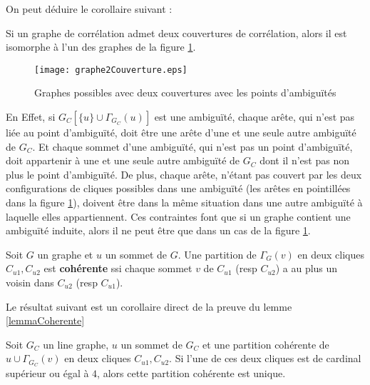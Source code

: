 On peut d\'eduire le corollaire suivant :
\begin{corollary}
Si un graphe de corr\'elation admet deux couvertures de corr\'elation, alors il est isomorphe \`a l'un des graphes de la figure  \ref{graphe2Couverture}.
\end{corollary}
\begin{centering} \vspace{-0.5em}
\begin{figure}[htb!] \vspace{-0.5em}
\texttt{[image: graphe2Couverture.eps]}
\caption{ Graphes possibles avec deux couvertures avec les points d'ambigu\"{i}t\'es }
\label{graphe2Couverture} 
\end{figure}
\end{centering} 
En Effet, si $G_C[\{u\} \cup \Gamma_{G_C}(u)]$ est une ambigu\"{i}t\'e, chaque ar\^ete, qui n'est pas li\'ee au point d'ambigu\"{i}t\'e, doit \^etre une ar\^ete d'une et une seule autre ambigu\"{i}t\'e de $G_C$. Et chaque sommet d'une ambigu\"{i}t\'e, qui n'est pas un point d'ambigu\"{i}t\'e, doit appartenir \`a une et une seule autre ambigu\"{i}t\'e de $G_C$ dont il n'est pas non  plus le point d'ambigu\"{i}t\'e.
De plus, chaque ar\^ete, n'\'etant pas couvert par les deux configurations de cliques possibles dans une ambigu\"{i}t\'e (les ar\^etes en pointill\'ees dans la figure \ref{graphe2Couverture}), doivent \^etre dans la m\^eme situation dans une autre ambigu\"{i}t\'e \`a laquelle elles appartiennent.
Ces contraintes font que si un graphe contient une ambigu\"{i}t\'e induite, alors il ne peut \^etre que dans un cas de la figure  \ref{graphe2Couverture}.

\begin{definition}
Soit $G$ un graphe et $u$ un sommet de $G$. Une partition de $\Gamma_G(v)$ en deux cliques $C_{u1}, C_{u2}$ est {\bf coh\'erente } ssi chaque sommet $v$ de $C_{u1}$ (resp $C_{u2}$) a au plus un voisin dans $C_{u2}$  (resp $C_{u1}$).
\end{definition}
Le r\'esultat suivant est un corollaire direct de la preuve du lemme \ref{lemmaCoherente}
\begin{lemma}
\label{lemmaCoherente}
Soit $G_C$ un line graphe, $u$ un sommet de $G_C$ et une partition coh\'erente de ${u} \cup \Gamma_{G_C}(v)$ en deux cliques  $C_{u1}, C_{u2}$. 
Si l'une de ces deux cliques est de cardinal sup\'erieur ou \'egal \`a $4$, alors cette partition coh\'erente est unique.
\end{lemma}

